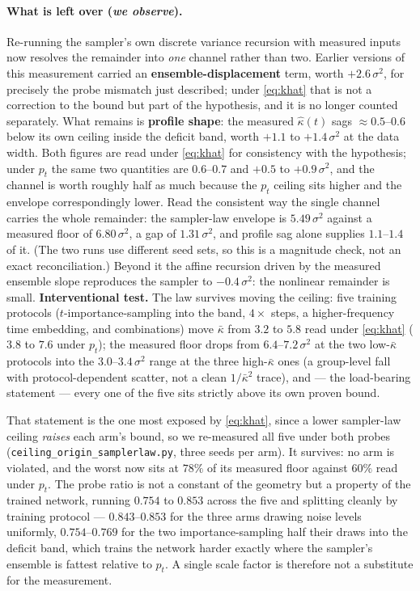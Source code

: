 \documentclass[11pt]{article}
\theoremstyle{remark}
\newcommand{\kb}{\bar\kappa}
\newcommand{\sigsq}{\sigma^2}
\begin{document}
\paragraph{What is left over (\emph{we observe}).} Re-running the sampler's own discrete
variance recursion with measured inputs now resolves the remainder into \emph{one}
channel rather than two. Earlier versions of this measurement carried an
\textbf{ensemble-displacement} term, worth $+2.6\,\sigsq$, for precisely the probe
mismatch just described; under \eqref{eq:khat} that is not a correction to the bound but
part of the hypothesis, and it is no longer counted separately. What remains is
\textbf{profile shape}: the measured $\hat\kappa(t)$ sags $\approx0.5$--$0.6$ below its
own ceiling inside the deficit band, worth $+1.1$ to $+1.4\,\sigsq$ at the data width. Both
figures are read under \eqref{eq:khat} for consistency with the hypothesis; under $p_t$ the
same two quantities are $0.6$--$0.7$ and $+0.5$ to $+0.9\,\sigsq$, and the channel is worth
roughly half as much because the $p_t$ ceiling sits higher and the envelope correspondingly
lower. Read the consistent way the single channel carries the whole remainder: the
sampler-law envelope is $5.49\,\sigsq$ against a measured floor of $6.80\,\sigsq$, a gap of
$1.31\,\sigsq$, and profile sag alone supplies $1.1$--$1.4$ of it. (The two runs use
different seed sets, so this is a magnitude check, not an exact reconciliation.) Beyond it
the affine recursion driven by the measured ensemble slope reproduces the sampler to
$-0.4\,\sigsq$: the nonlinear remainder is small. \textbf{Interventional test.} The law survives moving the ceiling: five
training protocols ($t$-importance-sampling into the band, $4\times$ steps, a
higher-frequency time embedding, and combinations) move $\kb$ from $3.2$ to $5.8$ read
under \eqref{eq:khat} ($3.8$ to $7.6$ under $p_t$); the measured floor drops from
$6.4$--$7.2\,\sigsq$ at the two low-$\kb$ protocols into the $3.0$--$3.4\,\sigsq$ range at
the three high-$\kb$ ones (a group-level fall with protocol-dependent scatter, not a clean
$1/\kb^2$ trace), and --- the load-bearing
statement --- every one of the five sits strictly above its own proven bound.

That statement is the one most exposed by \eqref{eq:khat}, since a lower sampler-law
ceiling \emph{raises} each arm's bound, so we re-measured all five under both probes
(\texttt{ceiling\_origin\_samplerlaw.py}, three seeds per arm). It survives: no arm is
violated, and the worst now sits at $78\%$ of its measured floor against $60\%$ read
under $p_t$. The probe ratio is not a constant of the geometry but a property of the
trained network, running $0.754$ to $0.853$ across the five and splitting cleanly by
training protocol --- $0.843$--$0.853$ for the three arms drawing noise levels uniformly,
$0.754$--$0.769$ for the two importance-sampling half their draws into the deficit band,
which trains the network harder exactly where the sampler's ensemble is fattest relative
to $p_t$. A single scale factor is therefore not a substitute for the measurement.
\end{document}
